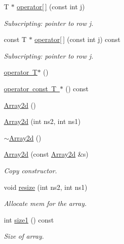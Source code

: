 \begin{DoxyCompactItemize}
T $\ast$ \mbox{\hyperlink{classXMLArray_1_1Array2d_a1e5b7fa596ec682113700320b08e66d5}{operator\mbox{[}$\,$\mbox{]}}} (const int j)
\begin{DoxyCompactList}\small\item\em Subscripting\+: pointer to row j. \end{DoxyCompactList}\item 
const T $\ast$ \mbox{\hyperlink{classXMLArray_1_1Array2d_a956a4739a0e6529302542b0fdf3c1da8}{operator\mbox{[}$\,$\mbox{]}}} (const int j) const
\begin{DoxyCompactList}\small\item\em Subscripting\+: pointer to row j. \end{DoxyCompactList}\item 
\mbox{\hyperlink{classXMLArray_1_1Array2d_a9d46505eb6c4149239bc87ba408c6b5b}{operator T$\ast$}} ()
\item 
\mbox{\hyperlink{classXMLArray_1_1Array2d_aabd815b03d3dfbcc079cab62408c6dfd}{operator const T $\ast$}} () const
\item 
\mbox{\hyperlink{classXMLArray_1_1Array2d_a2f24eccb279e2f1685b58b41f61d9330}{Array2d}} ()
\item 
\mbox{\hyperlink{classXMLArray_1_1Array2d_acb1e955b2aa805f3192c50cd723df524}{Array2d}} (int ns2, int ns1)
\item 
\mbox{\hyperlink{classXMLArray_1_1Array2d_a57639b142c7754fa2c11bb3ac5ee76d7}{$\sim$\+Array2d}} ()
\item 
\mbox{\hyperlink{classXMLArray_1_1Array2d_a0646ba9d0ce7616c1cc4a84a4794b186}{Array2d}} (const \mbox{\hyperlink{classXMLArray_1_1Array2d}{Array2d}} \&s)
\begin{DoxyCompactList}\small\item\em Copy constructor. \end{DoxyCompactList}\item 
void \mbox{\hyperlink{classXMLArray_1_1Array2d_a64001cb2aac062d2179a0285b0279244}{resize}} (int ns2, int ns1)
\begin{DoxyCompactList}\small\item\em Allocate mem for the array. \end{DoxyCompactList}\item 
int \mbox{\hyperlink{classXMLArray_1_1Array2d_a0f5dd764b391ddffd3d89c71bbc6c614}{size1}} () const
\begin{DoxyCompactList}\small\item\em Size of array. \end{DoxyCompactList}\item 

\end{DoxyCompactItemize}
